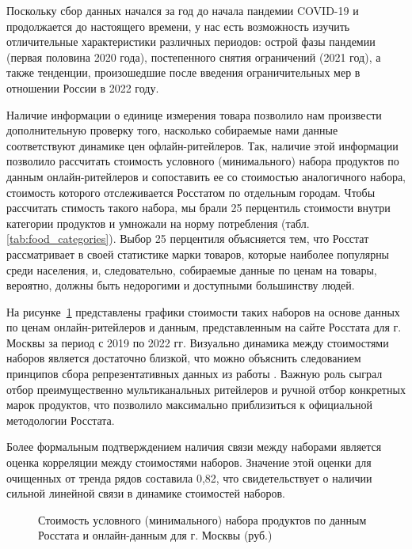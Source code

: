 Поскольку сбор данных начался за год до начала пандемии COVID-19 и продолжается до настоящего времени, у нас есть возможность изучить отличительные характеристики различных периодов: острой фазы пандемии (первая половина 2020 года), постепенного снятия ограничений (2021 год), а также тенденции, произошедшие после введения ограничительных мер в отношении России в 2022 году.

Наличие информации о единице измерения товара позволило нам произвести дополнительную проверку того, насколько собираемые нами данные соответствуют динамике цен офлайн-ритейлеров. Так, наличие этой информации позволило рассчитать стоимость условного (минимального) набора продуктов по данным онлайн-ритейлеров и сопоставить ее со стоимостью аналогичного набора, стоимость которого отслеживается Росстатом по отдельным городам. Чтобы рассчитать стимость такого набора, мы брали 25 перцентиль стоимости внутри категории продуктов и умножали на норму потребления (табл.~ \ref{tab:food_categories}). Выбор 25 перцентиля объясняется тем, что Росстат рассматривает в своей статистике марки товаров, которые наиболее популярны среди населения, и, следовательно, собираемые данные по ценам на товары, вероятно, должны быть недорогими и доступными большинству людей.

На рисунке~\cref{fig:basket_plot} представлены графики стоимости таких наборов на основе данных по ценам онлайн-ритейлеров и данным, представленным на сайте Росстата для г. Москвы за период с 2019 по 2022 гг. Визуально динамика между стоимостями наборов является достаточно близкой, что можно объяснить следованием принципов сбора репрезентативных данных из работы \cite{cavallo2016billion}. Важную роль сыграл отбор преимущественно мультиканальных ритейлеров и ручной отбор конкретных марок продуктов, что позволило максимально приблизиться к официальной методологии Росстата.

Более формальным подтверждением наличия связи между наборами является оценка корреляции между стоимостями наборов. Значение этой оценки для очищенных от тренда рядов составила 0,82, что свидетельствует о наличии сильной линейной связи в динамике стоимостей наборов.

\begin{figure}[ht]
	\caption{Стоимость условного (минимального) набора продуктов по данным Росстата и онлайн-данным для г. Москвы (руб.)}\label{fig:basket_plot}
\end{figure}

